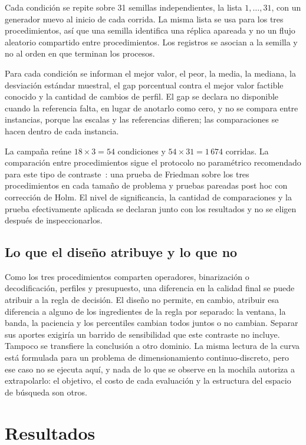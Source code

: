 \documentclass[runningheads]{llncs}
\begin{document}
Cada condición se repite sobre 31 semillas independientes, la lista $1, \ldots, 31$, con un generador nuevo al inicio de cada corrida. La misma lista se usa para los tres procedimientos, así que una semilla identifica una réplica apareada y no un flujo aleatorio compartido entre procedimientos. Los registros se asocian a la semilla y no al orden en que terminan los procesos.

Para cada condición se informan el mejor valor, el peor, la media, la mediana, la desviación estándar muestral, el gap porcentual contra el mejor valor factible conocido y la cantidad de cambios de perfil. El gap se declara no disponible cuando la referencia falta, en lugar de anotarlo como cero, y no se compara entre instancias, porque las escalas y las referencias difieren; las comparaciones se hacen dentro de cada instancia.

La campaña reúne $18 \times 3 = 54$ condiciones y $54 \times 31 = 1\,674$ corridas. La comparación entre procedimientos sigue el protocolo no paramétrico recomendado para este tipo de contraste~\cite{derrac2011practical}: una prueba de Friedman sobre los tres procedimientos en cada tamaño de problema y pruebas pareadas post hoc con corrección de Holm. El nivel de significancia, la cantidad de comparaciones y la prueba efectivamente aplicada se declaran junto con los resultados y no se eligen después de inspeccionarlos.

\subsection{Lo que el diseño atribuye y lo que no}
\label{sec:atribucion}

Como los tres procedimientos comparten operadores, binarización o decodificación, perfiles y presupuesto, una diferencia en la calidad final se puede atribuir a la regla de decisión. El diseño no permite, en cambio, atribuir esa diferencia a alguno de los ingredientes de la regla por separado: la ventana, la banda, la paciencia y los percentiles cambian todos juntos o no cambian. Separar sus aportes exigiría un barrido de sensibilidad que este contraste no incluye. Tampoco se transfiere la conclusión a otro dominio. La misma lectura de la curva está formulada para un problema de dimensionamiento continuo-discreto, pero ese caso no se ejecuta aquí, y nada de lo que se observe en la mochila autoriza a extrapolarlo: el objetivo, el costo de cada evaluación y la estructura del espacio de búsqueda son otros.

\section{Resultados}
\end{document}
